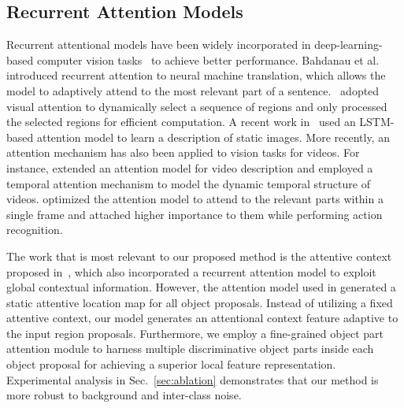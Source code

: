 \documentclass[journal]{IEEEtran}
\begin{document}
\subsection{Recurrent Attention Models}
Recurrent attentional models have been widely incorporated in deep-learning-based computer vision tasks~\cite{bahdanau2014neural, li2016attentive, mnih2014recurrent, xu2015show} to achieve better performance. Bahdanau et al.~\cite{bahdanau2014neural} introduced recurrent attention to neural machine translation, which allows the model to adaptively attend to the most relevant part of a sentence.~\cite{mnih2014recurrent} adopted visual attention to dynamically select a sequence of regions and only processed the selected regions for efficient computation. A recent work in~\cite{xu2015show} used an LSTM-based attention model to learn a description of static images. More recently, an attention mechanism has also been applied to vision tasks for videos. For instance, \cite{yao2015describing} extended an attention model for video description and employed a temporal attention mechanism to model the dynamic temporal structure of videos. \cite{sharma2015action} optimized the attention model to attend to the relevant parts within a single frame and attached higher importance to them while performing action recognition.

The  work that is most relevant  to our proposed method is the attentive context proposed in~\cite{li2016attentive}, which also incorporated a recurrent attention model to exploit global contextual information. However, the attention model used in \cite{li2016attentive} generated a static attentive location map for all object proposals. Instead of utilizing a fixed attentive context, our model generates an attentional context feature adaptive to the input region proposals. Furthermore, we employ a fine-grained object part attention module to harness multiple discriminative object parts inside each object proposal for achieving a superior local feature representation. Experimental analysis in Sec.~\ref{sec:ablation} demonstrates that our method is more robust to background and inter-class noise.
\end{document}
